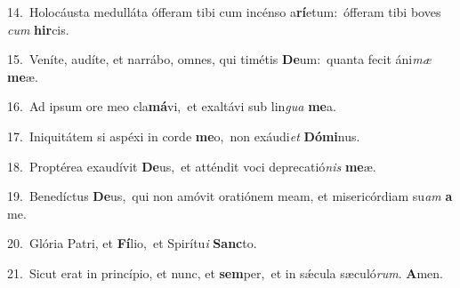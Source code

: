 {\numbfont\textcolor{\numbcolor}{14.}}~Holocáusta medulláta ófferam tibi cum incénso a\-\textbf{rí}\-etum:~\star ófferam tibi boves \textit{cum} \textbf{hir}\-cis.\par
{\numbfont\textcolor{\numbcolor}{15.}}~Veníte, audíte, et narrábo, omnes, qui timétis \textbf{De}\-um:~\star quanta fecit áni\textit{mæ} \textbf{me}\-æ.\par
{\numbfont\textcolor{\numbcolor}{16.}}~Ad ipsum ore meo cla\-\textbf{má}\-vi,~\star et exaltávi sub lin\textit{gua} \textbf{me}\-a.\par
{\numbfont\textcolor{\numbcolor}{17.}}~Iniquitátem si aspéxi in corde \textbf{me}\-o,~\star non exáudi\textit{et} \textbf{Dó}\-\textbf{mi}nus.\par
{\numbfont\textcolor{\numbcolor}{18.}}~Proptérea exaudívit \textbf{De}\-us,~\star et atténdit voci deprecatió\textit{nis} \textbf{me}\-æ.\par
{\numbfont\textcolor{\numbcolor}{19.}}~Benedíctus \textbf{De}\-us,~\star qui non amóvit oratiónem meam, et misericórdiam su\textit{am} \textbf{a} me.\par
{\numbfont\textcolor{\numbcolor}{20.}}~Glória Patri, et \textbf{Fí}\-lio,~\star et Spirítu\textit{i} \textbf{Sanc}\-to.\par
{\numbfont\textcolor{\numbcolor}{21.}}~Sicut erat in princípio, et nunc, et \textbf{sem}\-per,~\star et in sǽcula sæculó\-\textit{rum}\-. \textbf{A}\-men.\par
